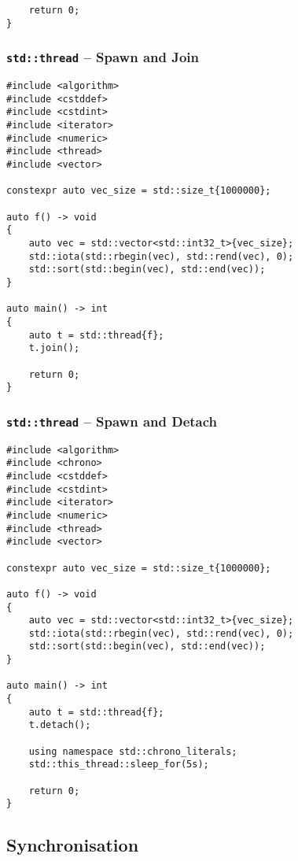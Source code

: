 \begin{appendix}
\begin{verbatim}
    return 0;
}
\end{verbatim}

\subsubsection{\texttt{std::thread} -- Spawn and Join}\label{app:conc_thread_join}

\begin{verbatim}
#include <algorithm>
#include <cstddef>
#include <cstdint>
#include <iterator>
#include <numeric>
#include <thread>
#include <vector>

constexpr auto vec_size = std::size_t{1000000};

auto f() -> void
{
    auto vec = std::vector<std::int32_t>{vec_size};
    std::iota(std::rbegin(vec), std::rend(vec), 0);
    std::sort(std::begin(vec), std::end(vec));
}

auto main() -> int
{
    auto t = std::thread{f};
    t.join();
    
    return 0;
}
\end{verbatim}

\subsubsection{\texttt{std::thread} -- Spawn and Detach}\label{app:conc_thread_detach}

\begin{verbatim}
#include <algorithm>
#include <chrono>
#include <cstddef>
#include <cstdint>
#include <iterator>
#include <numeric>
#include <thread>
#include <vector>

constexpr auto vec_size = std::size_t{1000000};

auto f() -> void
{
    auto vec = std::vector<std::int32_t>{vec_size};
    std::iota(std::rbegin(vec), std::rend(vec), 0);
    std::sort(std::begin(vec), std::end(vec));
}

auto main() -> int
{
    auto t = std::thread{f};
    t.detach();
    
    using namespace std::chrono_literals;
    std::this_thread::sleep_for(5s);
    
    return 0;
}
\end{verbatim}

\subsection{Synchronisation}\label{app:scorep_sync}


\end{appendix}
